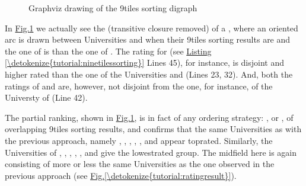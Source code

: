 \documentclass[a4paper,12pt,english]{sphinxhowto}
\let\sphinxpxdimen\pdfpxdimen\else\newdimen\sphinxpxdimen
\begin{document}
\begin{figure}[H]
\centering
\capstart

\noindent\sphinxincludegraphics[width=650\sphinxpxdimen]{{nineTilingDrawing}.png}
\caption{Graphviz drawing of the 9\sphinxhyphen{}tiles sorting digraph}\label{\detokenize{tutorial:ninetilingdrawing}}\end{figure}

In \hyperref[\detokenize{tutorial:ninetilingdrawing}]{Fig.\@ \ref{\detokenize{tutorial:ninetilingdrawing}}} we actually see the  (transitive closure removed) of a , where an oriented arc is drawn between Universities  and  when their 9\sphinxhyphen{}tiles sorting results are  and the one of  is  than the one of . The rating for  (see \hyperref[\detokenize{tutorial:ninetilessorting}]{Listing \ref{\detokenize{tutorial:ninetilessorting}}} Lines 45), for instance, is disjoint and higher rated than the one of the Universities  and  (Lines 23, 32). And, both the ratings of  and  are, however, not disjoint from the one, for instance, of the Universty of  (Line 42).

The partial ranking, shown in \hyperref[\detokenize{tutorial:ninetilingdrawing}]{Fig.\@ \ref{\detokenize{tutorial:ninetilingdrawing}}}, is in fact  of any ordering strategy: \sphinxhyphen{} , \sphinxhyphen{}  or \sphinxhyphen{} , of overlapping 9\sphinxhyphen{}tiles sorting results, and confirms that the same Universities as with the previous  approach, namely , , , , ,  and  appear top\sphinxhyphen{}rated. Similarly, the Universities of , , , , ,  and  give the lowest\sphinxhyphen{}rated group. The midfield here is again consisting of more or less the same Universities as the one observed in the previous  approach (see \hyperref[\detokenize{tutorial:ratingresult}]{Fig.\@ \ref{\detokenize{tutorial:ratingresult}}}).
\end{document}
